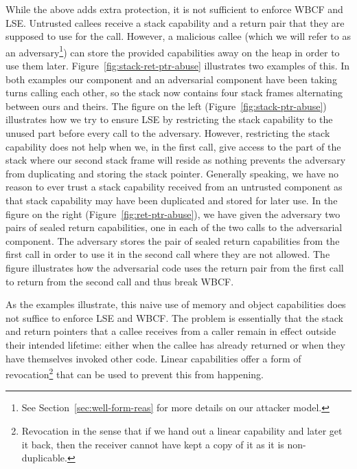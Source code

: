 \documentclass[acmsmall,screen]{acmart}\settopmatter{}
\begin{document}
While the above adds extra protection, it is not sufficient to enforce WBCF and LSE.
Untrusted callees receive a stack capability and a return pair that they are supposed to use for the call.
However, a malicious callee (which we will refer to as an adversary\footnote{See Section~\ref{sec:well-form-reas} for more details on our attacker model.}) can store the provided capabilities away on the heap in order to use them later.
Figure~\ref{fig:stack-ret-ptr-abuse} illustrates two examples of this.
In both examples our component and an adversarial component have been taking turns calling each other, so the stack now contains four stack frames alternating between ours and theirs.
The figure on the left (Figure~\ref{fig:stack-ptr-abuse}) illustrates how we try to ensure LSE by restricting the stack capability to the unused part before every call to the adversary.
However, restricting the stack capability does not help when we, in the first call, give access to the part of the stack where our second stack frame will reside as nothing prevents the adversary from duplicating and storing the stack pointer.
Generally speaking, we have no reason to ever trust a stack capability received from an untrusted component as that stack capability may have been duplicated and stored for later use.
In the figure on the right (Figure~\ref{fig:ret-ptr-abuse}), we have given the adversary two pairs of sealed return capabilities, one in each of the two calls to the adversarial component.
The adversary stores the pair of sealed return capabilities from the first call in order to use it in the second call where they are not allowed.
The figure illustrates how the adversarial code uses the return pair from the first call to return from the second call and thus break WBCF.

As the examples illustrate, this naive use of memory and object capabilities does not suffice to enforce LSE and WBCF.
The problem is essentially that the stack and return pointers that a callee receives from a caller remain in effect outside their intended lifetime: either when the callee has already returned or when they have themselves invoked other code. 
Linear capabilities offer a form of revocation\footnote{Revocation in the sense that if we hand out a linear capability and later get it back, then the receiver cannot have kept a copy of it as it is non-duplicable.} that can be used to prevent this from happening.
\end{document}
